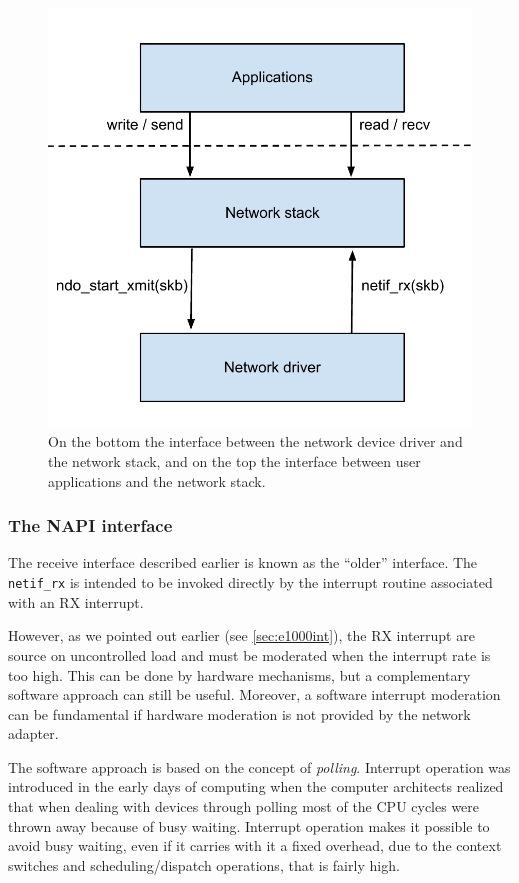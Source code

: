 \begin{figure}[bt]
\centering
\includegraphics[scale = 0.65]{linux-interface.pdf}
\caption{On the bottom the interface between the network device driver and the network stack, and on the top the interface between
user applications and the network stack.}
\label{fig:linux-interface}
\end{figure}


\subsubsection{The NAPI interface}
\label{sec:napi}
The receive interface described earlier is known as the ``older'' interface. The \texttt{netif\_rx} is intended to be invoked
directly by the interrupt routine associated with an RX interrupt.

However, as we pointed out earlier (see \ref{sec:e1000int}), the RX interrupt are source on uncontrolled load and must be moderated when
the interrupt rate is too high. This can be done by hardware mechanisms, but a complementary software approach can still be useful.
Moreover, a software interrupt moderation can be fundamental if hardware moderation is not provided by the network adapter.

\vspace{0.5cm}

The software approach is based on the concept of \emph{polling}. Interrupt operation was introduced in the early days of computing when
the computer architects realized that when dealing with devices through polling most of the CPU cycles were thrown away because of
busy waiting. Interrupt operation makes it possible to avoid busy waiting, even if it carries with it a fixed overhead, due to the
context switches and scheduling/dispatch operations, that is fairly high.


